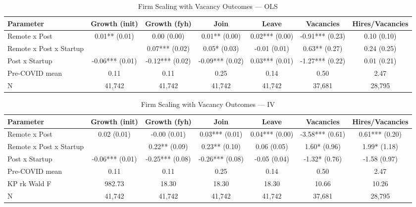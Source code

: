 \documentclass{article}
\begin{document}
\begin{table}[H]
\centering
\caption{Firm Scaling with Vacancy Outcomes — OLS}
\label{tab:firm_scaling_vacancy_ols}
\begin{tabular}{lcccccc}
\hline
Parameter & Growth (init) & Growth (fyh) & Join & Leave & Vacancies & Hires/Vacancies \\
\hline
Remote x Post & 0.01** (0.01) & 0.00 (0.00) & 0.01** (0.00) & 0.02*** (0.00) & -0.91*** (0.23) & 0.10 (0.10) \\
Remote x Post x Startup &  & 0.07*** (0.02) & 0.05* (0.03) & -0.01 (0.01) & 0.63** (0.27) & 0.24 (0.25) \\
Post x Startup & -0.06*** (0.01) & -0.12*** (0.02) & -0.09*** (0.02) & 0.03*** (0.01) & -1.27*** (0.22) & 0.01 (0.21) \\
\hline
Pre-COVID mean & 0.11 & 0.11 & 0.25 & 0.14 & 0.50 & 2.47 \\
N & 41,742 & 41,742 & 41,742 & 41,742 & 37,681 & 28,795 \\
\hline
\end{tabular}
\end{table}
\vspace{1cm}
\begin{table}[H]
\centering
\caption{Firm Scaling with Vacancy Outcomes — IV}
\label{tab:firm_scaling_vacancy_iv}
\begin{tabular}{lcccccc}
\hline
Parameter & Growth (init) & Growth (fyh) & Join & Leave & Vacancies & Hires/Vacancies \\
\hline
Remote x Post & 0.02 (0.01) & -0.00 (0.01) & 0.03*** (0.01) & 0.04*** (0.00) & -3.58*** (0.61) & 0.61*** (0.20) \\
Remote x Post x Startup &  & 0.22** (0.09) & 0.23** (0.10) & 0.06 (0.05) & 1.60* (0.96) & 1.99* (1.18) \\
Post x Startup & -0.06*** (0.01) & -0.25*** (0.08) & -0.26*** (0.08) & -0.05 (0.04) & -1.32* (0.76) & -1.58 (0.97) \\
\hline
Pre-COVID mean & 0.11 & 0.11 & 0.25 & 0.14 & 0.50 & 2.47 \\
KP rk Wald F & 982.73 & 18.30 & 18.30 & 18.30 & 10.66 & 10.26 \\
N & 41,742 & 41,742 & 41,742 & 41,742 & 37,681 & 28,795 \\
\hline
\end{tabular}
\end{table}
\end{document}
